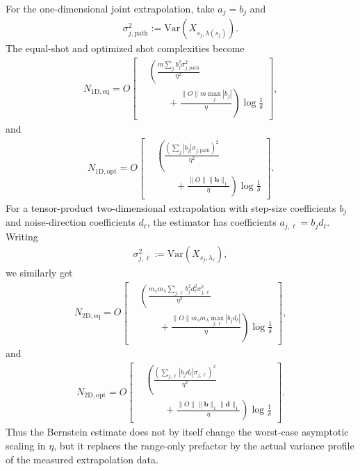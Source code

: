 \documentclass[aps,pra,reprint,groupedaddress,floatfix]{revtex4-2}
\begin{document}
For the one-dimensional joint extrapolation, take $a_j=b_j$ and
\begin{align*}
    \sigma_{j,\mathrm{path}}^2
    :=
    \mathrm{Var}\!\left(X_{s_j,\lambda(s_j)}\right).
\end{align*}
The equal-shot and optimized shot complexities become
\begin{align}
\label{eq:1d-equal-shot}
    N_{\mathrm{1D,eq}}
    =
    O\left[
    \begin{aligned}
    &\left(
    \frac{m\sum_j b_j^2\sigma_{j,\mathrm{path}}^2}{\eta^2}\right.\\
    &\left.\qquad+
    \frac{\|O\|m\max_j|b_j|}{\eta}
    \right)\log\frac{1}{\delta}
    \end{aligned}
    \right],
\end{align}
and
\begin{align}
\label{eq:1d-opt-shot}
    N_{\mathrm{1D,opt}}
    =
    O\left[
    \begin{aligned}
    &\left(
    \frac{\left(\sum_j |b_j|\sigma_{j,\mathrm{path}}\right)^2}{\eta^2}\right.\\
    &\left.\qquad+
    \frac{\|O\|\|\mathbf b\|_1}{\eta}
    \right)\log\frac{1}{\delta}
    \end{aligned}
    \right].
\end{align}
For a tensor-product two-dimensional extrapolation with step-size coefficients $b_j$ and noise-direction coefficients $d_\ell$, the estimator has coefficients $a_{j,\ell}=b_jd_\ell$. Writing
\begin{align*}
    \sigma_{j,\ell}^2
    :=
    \mathrm{Var}\!\left(X_{s_j,\lambda_\ell}\right),
\end{align*}
we similarly get
\begin{align}
\label{eq:2d-equal-shot}
    N_{\mathrm{2D,eq}}
    =
    O\left[
    \begin{aligned}
    &\left(
    \frac{m_sm_\lambda\sum_{j,\ell} b_j^2d_\ell^2\sigma_{j,\ell}^2}{\eta^2}
    \right.\\
    &\left.\qquad+
    \frac{\|O\|m_sm_\lambda\max_{j,\ell}|b_jd_\ell|}{\eta}
    \right)\log\frac{1}{\delta}
    \end{aligned}
    \right],
\end{align}
and
\begin{align}
\label{eq:2d-opt-shot}
    N_{\mathrm{2D,opt}}
    =
    O\left[
    \begin{aligned}
    &\left(
    \frac{\left(\sum_{j,\ell}|b_jd_\ell|\sigma_{j,\ell}\right)^2}{\eta^2}
    \right.\\
    &\left.\qquad+
    \frac{\|O\|\|\mathbf b\|_1\|\mathbf d\|_1}{\eta}
    \right)\log\frac{1}{\delta}
    \end{aligned}
    \right].
\end{align}
Thus the Bernstein estimate does not by itself change the worst-case asymptotic scaling in $\eta$, but it replaces the range-only prefactor by the actual variance profile of the measured extrapolation data.
\end{document}
